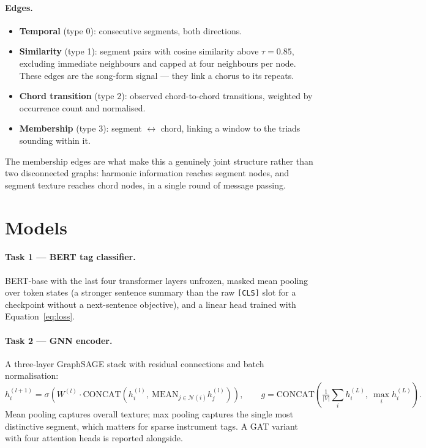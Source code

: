 \documentclass{article}
\begin{document}
\paragraph{Edges.}
\begin{itemize}
  \item \textbf{Temporal} (type 0): consecutive segments, both directions.
  \item \textbf{Similarity} (type 1): segment pairs with cosine similarity above
        $\tau = 0.85$, excluding immediate neighbours and capped at four
        neighbours per node. These edges are the song-form signal --- they link a
        chorus to its repeats.
  \item \textbf{Chord transition} (type 2): observed chord-to-chord transitions,
        weighted by occurrence count and normalised.
  \item \textbf{Membership} (type 3): segment $\leftrightarrow$ chord, linking a
        window to the triads sounding within it.
\end{itemize}

The membership edges are what make this a genuinely joint structure rather than
two disconnected graphs: harmonic information reaches segment nodes, and segment
texture reaches chord nodes, in a single round of message passing.

\section{Models}
\label{sec:models}

\paragraph{Task 1 --- BERT tag classifier.} BERT-base with the last four
transformer layers unfrozen, masked mean pooling over token states (a stronger
sentence summary than the raw \texttt{[CLS]} slot for a checkpoint without a
next-sentence objective), and a linear head trained with
Equation~\ref{eq:loss}.

\paragraph{Task 2 --- GNN encoder.} A three-layer GraphSAGE stack with residual
connections and batch normalisation:
\begin{equation}
h_i^{(l+1)} = \sigma\!\left( W^{(l)} \cdot \mathrm{CONCAT}\!\left( h_i^{(l)}, \ \mathrm{MEAN}_{j \in \mathcal{N}(i)} h_j^{(l)} \right) \right),
\qquad
g = \mathrm{CONCAT}\!\left( \tfrac{1}{|V|}\textstyle\sum_i h_i^{(L)}, \ \max_i h_i^{(L)} \right).
\end{equation}
Mean pooling captures overall texture; max pooling captures the single most
distinctive segment, which matters for sparse instrument tags. A GAT variant with
four attention heads is reported alongside.
\end{document}
